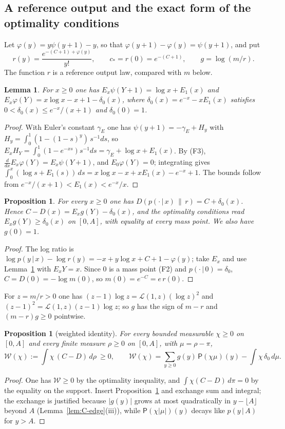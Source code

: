 \documentclass[10pt,letterpaper]{article}
\newtheorem{lemma}[theorem]{Lemma}
\newtheorem{proposition}[theorem]{Proposition}
\begin{document}
\subsection{A reference output and the exact form of the optimality conditions}

Let $\varphi(y)=y\psi(y+1)-y$, so that $\varphi(y+1)-\varphi(y)=\psi(y+1)$, and put
\[
r(y)=\frac{e^{-(C+1)+\varphi(y)}}{y!},\qquad c_*=r(0)=e^{-(C+1)},\qquad g=\log(m/r).
\]
The function $r$ is a reference output law, compared with $m$ below.

\begin{lemma}\label{lem:C-digamma}
For $x\ge0$ one has $E_x\psi(Y+1)=\log x+E_1(x)$ and $E_x\varphi(Y)=x\log x-x+1-\delta_0(x)$, where $\delta_0(x)=e^{-x}-xE_1(x)$ satisfies
$0<\delta_0(x)\le e^{-x}/(x+1)$ and $\delta_0(0)=1$.
\end{lemma}
\begin{proof}
With Euler's constant $\gamma_E$ one has $\psi(y+1)=-\gamma_E+H_y$ with $H_y=\int_0^1(1-(1-s)^y)\,s^{-1}ds$, so $E_xH_Y=\int_0^1(1-e^{-xs})s^{-1}ds=\gamma_E+\log x+E_1(x)$.
By (F3), $\frac{d}{dx}E_x\varphi(Y)=E_x\psi(Y+1)$, and $E_0\varphi(Y)=0$; integrating gives
$\int_0^x(\log s+E_1(s))\,ds=x\log x-x+xE_1(x)-e^{-x}+1$. The bounds follow from $e^{-x}/(x+1)<E_1(x)<e^{-x}/x$.
\end{proof}

\begin{proposition}\label{prop:C-kkt}
For every $x\ge0$ one has $D(p(\cdot\,|\,x)\,\|\,r)=C+\delta_0(x)$. Hence $C-D(x)=E_xg(Y)-\delta_0(x)$, and the optimality conditions read
$E_xg(Y)\ge\delta_0(x)$ on $[0,A]$, with equality at every mass point. We also have $g(0)=1$.
\end{proposition}
\begin{proof}
The log ratio is $\log p(y\,|\,x)-\log r(y)=-x+y\log x+C+1-\varphi(y)$; take $E_x$ and use Lemma~\ref{lem:C-digamma} with $E_xY=x$. Since $0$ is a
mass point (F2) and $p(\cdot\,|\,0)=\delta_0$, $C=D(0)=-\log m(0)$, so $m(0)=e^{-C}=e\,r(0)$.
\end{proof}

For $z=m/r>0$ one has $(z-1)\log z=\mathcal L(1,z)(\log z)^2$ and $(z-1)^2=\mathcal L(1,z)(z-1)\log z$; so $g$ has the sign of $m-r$ and
$(m-r)g\ge0$ pointwise.

\begin{proposition}[weighted identity]\label{prop:C-weighted}
For every bounded measurable $\chi\ge0$ on $[0,A]$ and every finite measure $\rho\ge0$ on $[0,A]$, with $\mu=\rho-\pi$,
\[
\mathcal W(\chi):=\int\chi\,(C-D)\,d\rho\ \ge0,\qquad
\mathcal W(\chi)=\sum_{y\ge0}g(y)\,\mathsf P(\chi\mu)(y)-\int\chi\,\delta_0\,d\mu .
\]
\end{proposition}
\begin{proof}
One has $\mathcal W\ge0$ by the optimality inequality, and $\int\chi(C-D)\,d\pi=0$ by the equality on the support. Insert
Proposition~\ref{prop:C-kkt} and exchange sum and integral; the exchange is justified because $|g(y)|$ grows at most quadratically
in $y-\lfloor A\rfloor$ beyond $A$ (Lemma~\ref{lem:C-edge}(iii)), while $\mathsf P(\chi|\mu|)(y)$ decays like $p(y\,|\,A)$ for $y>A$.
\end{proof}
\end{document}
